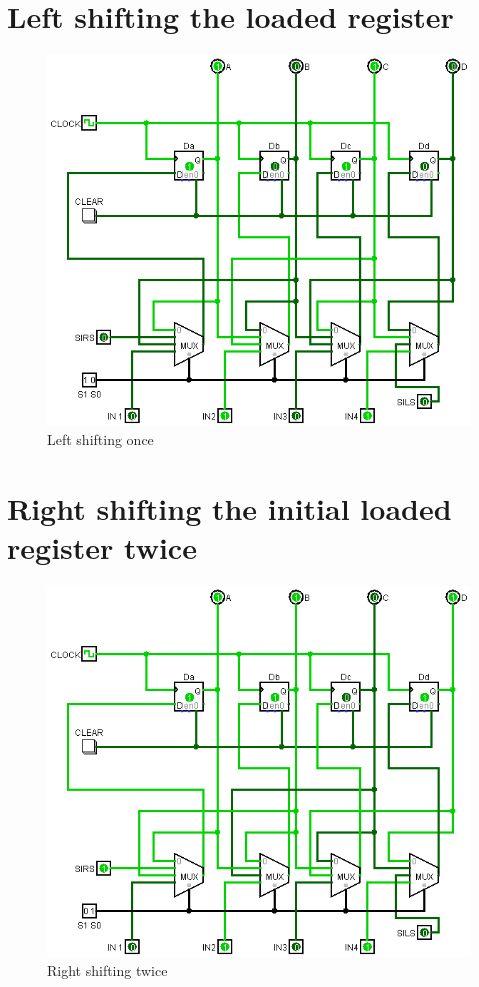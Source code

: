 \documentclass[12pt]{article}
\begin{document}
    \section{Left shifting the loaded register}
    \begin{figure}[ht]
        \centering
        \includegraphics[scale=0.50]{leftshift.png}
        \caption{Left shifting once}
    \end{figure}
    \newpage
    \section{Right shifting the initial loaded register twice}
    \begin{figure}[ht]
        \centering
        \includegraphics[scale=0.50]{rightshift.png}
        \caption{Right shifting twice}
    \end{figure}
\end{document}
